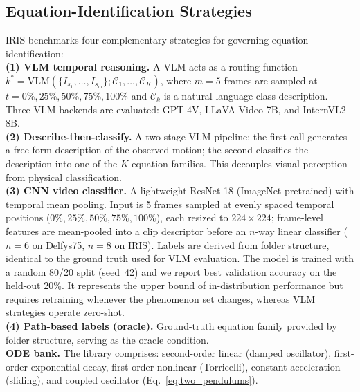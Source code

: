 \documentclass[runningheads]{llncs}
\begin{document}
\subsection{Equation-Identification Strategies}
\label{sec:baseline_eq_id}

IRIS benchmarks four complementary strategies for governing-equation identification:
\\
\noindent
\textbf{(1) VLM temporal reasoning.} A VLM acts as a routing function $k^* = \mathrm{VLM}(\{I_{s_1}, \ldots, I_{s_m}\}; \mathcal{C}_1, \ldots, \mathcal{C}_K)$, where $m{=}5$ frames are sampled at $t = 0\%, 25\%, 50\%, 75\%, 100\%$ and $\mathcal{C}_k$ is a natural-language class description. Three VLM backends are evaluated: GPT-4V, LLaVA-Video-7B, and InternVL2-8B.
\\
\noindent
\textbf{(2) Describe-then-classify.} A two-stage VLM pipeline: the first call generates a free-form description of the observed motion; the second classifies the description into one of the $K$ equation families. This decouples visual perception from physical classification.
\\
\noindent
\textbf{(3) CNN video classifier.} A lightweight ResNet-18 (ImageNet-pretrained) with temporal mean pooling. Input is 5 frames sampled at evenly spaced temporal positions ($0\%, 25\%, 50\%, 75\%, 100\%$), each resized to $224{\times}224$; frame-level features are mean-pooled into a clip descriptor before an $n$-way linear classifier ($n{=}6$ on Delfys75, $n{=}8$ on IRIS). Labels are derived from folder structure, identical to the ground truth used for VLM evaluation. The model is trained with a random 80/20 split (seed~42) and we report best validation accuracy on the held-out 20\%. It represents the upper bound of in-distribution performance but requires retraining whenever the phenomenon set changes, whereas VLM strategies operate zero-shot.
\\
\noindent
\textbf{(4) Path-based labels (oracle).} Ground-truth equation family provided by folder structure, serving as the oracle condition.
\\
\noindent
\textbf{ODE bank.} The library comprises: second-order linear (damped oscillator), first-order exponential decay, first-order nonlinear (Torricelli), constant acceleration (sliding), and coupled oscillator (Eq.~\ref{eq:two_pendulums}).

\end{document}
